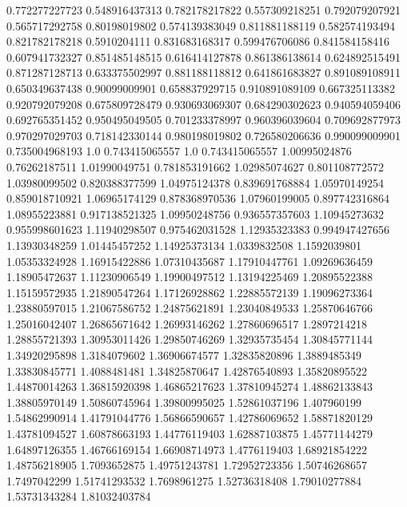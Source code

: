  0.772277227723   0.548916437313
 0.782178217822   0.557309218251
 0.792079207921   0.565717292758
  0.80198019802   0.574139383049
 0.811881188119   0.582574193494
 0.821782178218     0.5910204111
 0.831683168317   0.599476706086
 0.841584158416   0.607941732327
 0.851485148515   0.616414127878
 0.861386138614   0.624892515491
 0.871287128713   0.633375502997
 0.881188118812   0.641861683827
 0.891089108911   0.650349637438
  0.90099009901   0.658837929715
 0.910891089109   0.667325113382
 0.920792079208   0.675809728479
 0.930693069307   0.684290302623
 0.940594059406   0.692765351452
 0.950495049505   0.701233378997
 0.960396039604   0.709692877973
 0.970297029703   0.718142330144
 0.980198019802   0.726580206636
 0.990099009901   0.735004968193
            1.0   0.743415065557
            1.0   0.743415065557
  1.00995024876    0.76262187511
  1.01990049751   0.781853191662
  1.02985074627   0.801108772572
  1.03980099502   0.820388377599
  1.04975124378   0.839691768884
  1.05970149254   0.859018710921
  1.06965174129   0.878368970536
  1.07960199005   0.897742316864
  1.08955223881   0.917138521325
  1.09950248756   0.936557357603
  1.10945273632   0.955998601623
  1.11940298507   0.975462031528
  1.12935323383   0.994947427656
  1.13930348259    1.01445457252
  1.14925373134     1.0339832508
   1.1592039801    1.05353324928
  1.16915422886    1.07310435687
  1.17910447761    1.09269636459
  1.18905472637    1.11230906549
  1.19900497512    1.13194225469
  1.20895522388    1.15159572935
  1.21890547264    1.17126928862
  1.22885572139    1.19096273364
  1.23880597015    1.21067586752
  1.24875621891    1.23040849533
  1.25870646766    1.25016042407
  1.26865671642    1.26993146262
  1.27860696517     1.2897214218
  1.28855721393    1.30953011426
  1.29850746269    1.32935735454
  1.30845771144    1.34920295898
   1.3184079602    1.36906674577
  1.32835820896     1.3889485349
  1.33830845771     1.4088481481
  1.34825870647    1.42876540893
  1.35820895522    1.44870014263
  1.36815920398    1.46865217623
  1.37810945274    1.48862133843
  1.38805970149    1.50860745964
  1.39800995025    1.52861037196
    1.407960199    1.54862990914
  1.41791044776    1.56866590657
  1.42786069652    1.58871820129
  1.43781094527    1.60878663193
  1.44776119403    1.62887103875
  1.45771144279    1.64897126355
  1.46766169154    1.66908714973
   1.4776119403    1.68921854222
  1.48756218905     1.7093652875
  1.49751243781    1.72952723356
  1.50746268657     1.7497042299
  1.51741293532     1.7698961275
  1.52736318408    1.79010277884
  1.53731343284    1.81032403784
